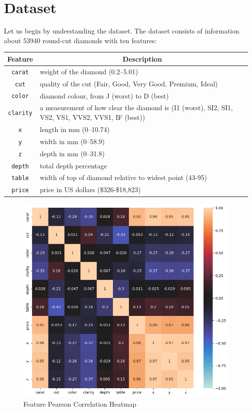 \documentclass[11pt,letterpaper]{article}
\begin{document}
\section*{Dataset}
Let us begin by understanding the dataset. The dataset consists of information
about 53940 round-cut diamonds with ten features: 
\begin{table}[ht]

\label{table1} 
\begin{tabular}{cl} 
\hline
\multicolumn{1}{c}{Feature} & \multicolumn{1}{c}{Description}\\
\hline 
    \texttt{carat} & weight of the diamond (0.2–5.01) \\
    \texttt{cut} & quality of the cut (Fair, Good, Very Good, Premium, Ideal) \\
    \texttt{color} & diamond colour, from J (worst) to D (best) \\
    \texttt{clarity} & a measurement of how clear the diamond is (I1 (worst),  
    SI2, SI1, VS2, VS1, VVS2, VVS1, IF (best)) \\
    \texttt{x} & length in mm (0–10.74) \\
    \texttt{y} & width in mm (0–58.9) \\
    \texttt{z} & depth in mm (0–31.8) \\
    \texttt{depth} & total depth percentage \\
    \texttt{table} & width of top of diamond relative to widest point (43-95) \\
    \texttt{price} & price in US dollars (\$326-\$18,823)
\end{tabular}
\end{table}
\begin{figure}[H]
    \centering
   \includegraphics[width=0.5\linewidth]{../Figures/Question-1/datasetCorrHeatmap.png}
   \caption{Feature Pearson Correlation Heatmap}
   \label{fig:corr_hm}
\end{figure}
\end{document}

